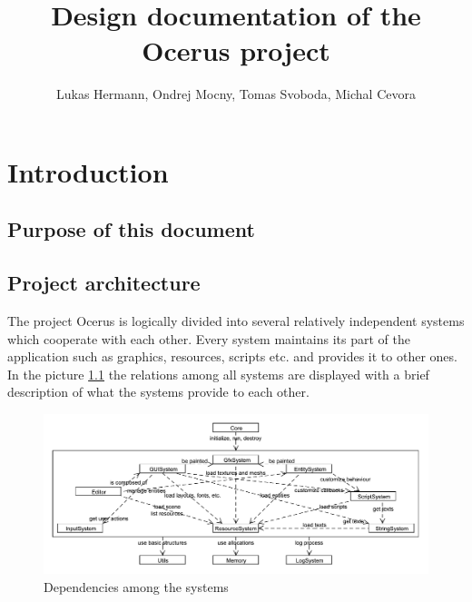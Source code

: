\documentclass[a4paper, 12pt]{report}
\begin{document}
\pagestyle{empty} %

\title{Design documentation of the Ocerus project}
\author{Lukas Hermann, Ondrej Mocny, Tomas Svoboda, Michal Cevora}
\maketitle

\pagestyle{plain} %

\tableofcontents %
\cleardoublepage %

\chapter{Introduction}

\section{Purpose of this document}

\section{Project architecture}

The project Ocerus is logically divided into several relatively independent systems which cooperate with each other. Every system maintains its part of the application such as graphics, resources, scripts etc. and provides it to other ones. In the picture \ref{fig:system-connection} the relations among all systems are displayed with a brief description of what the systems provide to each other.

\begin{figure}[htbp]
	\centering
		\includegraphics[width=1\textwidth]{SystemConnection.pdf}
	\caption{Dependencies among the systems}
	\label{fig:system-connection}
\end{figure}
\end{document}

